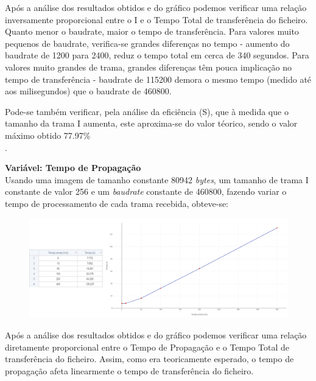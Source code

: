 \documentclass[a4paper, 11pt]{article}
\begin{document}
Após a análise dos resultados obtidos e do gráfico podemos verificar uma relação inversamente proporcional entre o  I e o Tempo Total de transferência do ficheiro. Quanto menor o baudrate, maior o tempo de transferência.  Para valores muito pequenos de baudrate, verifica-se grandes diferenças no tempo - aumento do baudrate de 1200 para 2400, reduz o tempo total em cerca de 340 segundos. Para valores muito grandes de trama, grandes diferenças têm pouca implicação no tempo de transferência - baudrate de  115200 demora o mesmo tempo (medido até aos milisegundos) que o baudrate de 460800.

Pode-se também verificar, pela análise da eficiência (S), que à medida que o tamanho da trama I aumenta, este aproxima-se do valor téorico, sendo o valor máximo obtido 77.97\%\\.

\textbf{Variável: Tempo de Propagação}\\
Usando uma imagem de tamanho constante 80942 \textit{bytes}, um tamanho de trama I constante de valor 256 e um \textit{baudrate} constante de 460800, fazendo variar o tempo de processamento de cada trama recebida, obteve-se:
\begin{figure}[h!]
\begin{center}
\includegraphics[scale=0.3]{images/TProp.png}
\end{center}
\end{figure}

Após a análise dos resultados obtidos e do gráfico podemos verificar uma relação diretamente proporcional entre o Tempo de Propagação e o Tempo Total de transferência do ficheiro. Assim, como era teoricamente esperado, o tempo de propagação afeta linearmente o tempo de transferência do ficheiro.
\end{document}
